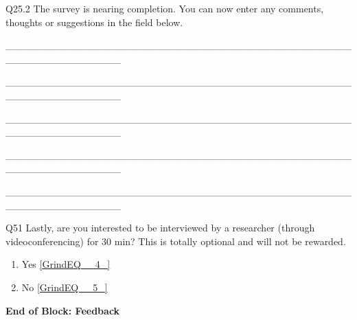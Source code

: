 \documentclass{article} %
\begin{document}
\noindent 

\noindent 

\noindent 

\noindent Q25.2 The survey is nearing completion. You can now enter any comments, thoughts or suggestions in the field below.

\_\_\_\_\_\_\_\_\_\_\_\_\_\_\_\_\_\_\_\_\_\_\_\_\_\_\_\_\_\_\_\_\_\_\_\_\_\_\_\_\_\_\_\_\_\_\_\_\_\_\_\_\_\_\_\_\_\_\_\_\_\_\_\_

\_\_\_\_\_\_\_\_\_\_\_\_\_\_\_\_\_\_\_\_\_\_\_\_\_\_\_\_\_\_\_\_\_\_\_\_\_\_\_\_\_\_\_\_\_\_\_\_\_\_\_\_\_\_\_\_\_\_\_\_\_\_\_\_

\_\_\_\_\_\_\_\_\_\_\_\_\_\_\_\_\_\_\_\_\_\_\_\_\_\_\_\_\_\_\_\_\_\_\_\_\_\_\_\_\_\_\_\_\_\_\_\_\_\_\_\_\_\_\_\_\_\_\_\_\_\_\_\_

\_\_\_\_\_\_\_\_\_\_\_\_\_\_\_\_\_\_\_\_\_\_\_\_\_\_\_\_\_\_\_\_\_\_\_\_\_\_\_\_\_\_\_\_\_\_\_\_\_\_\_\_\_\_\_\_\_\_\_\_\_\_\_\_

\_\_\_\_\_\_\_\_\_\_\_\_\_\_\_\_\_\_\_\_\_\_\_\_\_\_\_\_\_\_\_\_\_\_\_\_\_\_\_\_\_\_\_\_\_\_\_\_\_\_\_\_\_\_\_\_\_\_\_\_\_\_\_\_

\noindent 

\noindent 

\noindent 

\noindent Q51 Lastly, are you interested to be interviewed by a researcher (through videoconferencing) for 30 min? This is totally optional and will not be rewarded.

\begin{enumerate}
\item  Yes  \eqref{GrindEQ__4_} 

\item  No  \eqref{GrindEQ__5_} 
\end{enumerate}

\noindent 

\noindent \textbf{End of Block: Feedback}

\noindent \textbf{}

\noindent 
\end{document}
